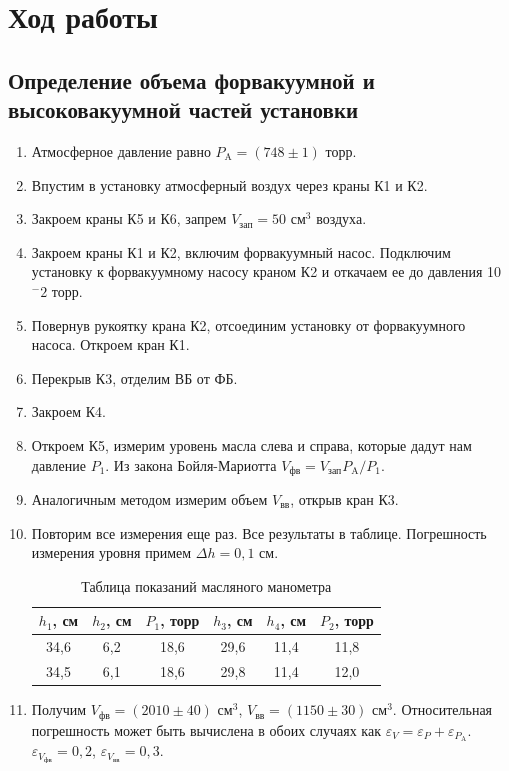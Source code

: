 \documentclass[12pt]{article}
\begin{document}
    \section{Ход работы}
    \subsection{Определение объема форвакуумной и высоковакуумной частей
    установки}
    \begin{enumerate}
        \item Атмосферное давление равно $P_{\text{A}} = (748\pm1)$ торр.
        \item Впустим в установку атмосферный воздух через краны К1 и К2.
        \item Закроем краны К5 и К6, запрем $V_{\text{зап}} = 50$ см$^3$ 
        воздуха.
        \item Закроем краны К1 и К2, включим форвакуумный насос. Подключим
        установку к форвакуумному насосу краном К2 и откачаем ее до давления
        10$^-2$ торр.
        \item Повернув рукоятку крана К2, отсоединим установку от форвакуумного
        насоса. Откроем кран К1.
        \item Перекрыв К3, отделим ВБ от ФБ.
        \item Закроем К4.
        \item Откроем К5, измерим уровень масла слева и справа, которые
        дадут нам давление $P_1$.
        Из закона Бойля-Мариотта $V_{\text{фв}} = V_{\text{зап}}P_{\text{A}}/
        P_1$.
        \item Аналогичным методом измерим объем $V_{\text{вв}}$, открыв кран 
        К3. 
        \item Повторим все измерения еще раз. Все результаты в таблице. 
        Погрешность измерения уровня примем $\Delta h = 0{,}1$ см.
        \begin{table}[H]
            \centering
            \begin{tabular}{|c|c|c|c|c|c|}
                \hline
                $h_1$, см & $h_2$, см & $P_1$, торр & $h_3$, см & $h_4$, см & $P_2$, торр \\\hline
                34{,}6 & 6{,}2 & 18{,}6 & 29{,}6 & 11{,}4 & 11{,}8 \\\hline
                34{,}5 & 6{,}1 & 18{,}6 & 29{,}8 & 11{,}4 & 12{,}0 \\\hline
            \end{tabular}
            \caption{Таблица показаний масляного манометра}
        \end{table}
        \item Получим $V_{\text{фв}} = (2010\pm40)$ см$^3$, 
        $V_{\text{вв}} = (1150\pm30)$ см$^3$. Относительная погрешность может 
        быть вычислена в обоих случаях как $\varepsilon_V = \varepsilon_P + 
        \varepsilon_{P_{\text{A}}}$. $\varepsilon_{V_{\text{фв}}} = 0{,}2$, 
        $\varepsilon_{V_{\text{вв}}} = 0{,}3$.
        
    \end{enumerate}
\end{document}
